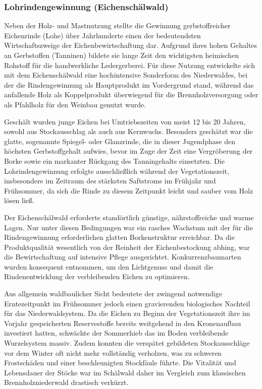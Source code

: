 \documentclass[twocolumn, bibliography=totoc, abstract=true]{scrartcl}
\begin{document}
\subsubsection{Lohrindengewinnung (Eichenschälwald)}

Neben der Holz- und Mastnutzung stellte die Gewinnung gerbstoffreicher Eichenrinde (Lohe) über Jahrhunderte einen der bedeutendsten Wirtschaftszweige der Eichenbewirtschaftung dar. Aufgrund ihres hohen Gehaltes an Gerbstoffen (Tanninen) bildete sie lange Zeit den wichtigsten heimischen Rohstoff für die handwerkliche Ledergerberei. Für diese Nutzung entwickelte sich mit dem Eichenschälwald eine hochintensive Sonderform des Niederwaldes, bei der die Rindengewinnung als Hauptprodukt im Vordergrund stand, während das anfallende Holz als Koppelprodukt überwiegend für die Brennholzversorgung oder als Pfahlholz für den Weinbau genutzt wurde.

Geschält wurden junge Eichen bei Umtriebszeiten von meist 12 bis 20 Jahren, sowohl aus Stockausschlag als auch aus Kernwuchs. Besonders geschätzt war die glatte, sogenannte Spiegel- oder Glanzrinde, die in dieser Jugendphase den höchsten Gerbstoffgehalt aufwies, bevor im Zuge der Zeit eine Vergröberung der Borke sowie ein markanter Rückgang des Tanningehalts einsetzten. Die Lohrindengewinnung erfolgte ausschließlich während der Vegetationszeit, insbesondere im Zeitraum des stärksten Saftstroms im Frühjahr und Frühsommer, da sich die Rinde zu diesem Zeitpunkt leicht und sauber vom Holz lösen ließ.

Der Eichenschälwald erforderte standörtlich günstige, nährstoffreiche und warme Lagen. Nur unter diesen Bedingungen war ein rasches Wachstum mit der für die Rindengewinnung erforderlichen glatten Borkenstruktur erreichbar. Da die Produktqualität wesentlich von der Reinheit der Eichenbestockung abhing, war die Bewirtschaftung auf intensive Pflege ausgerichtet. Konkurrenzbaumarten wurden konsequent entnommen, um den Lichtgenuss und damit die Rindenentwicklung der verbleibenden Eichen zu optimieren.

Aus allgemein waldbaulicher Sicht bedeutete der zwingend notwendige Erntezeitpunkt im Frühsommer jedoch einen gravierenden biologisches Nachteil für das Niederwaldsystem. Da die Eichen zu Beginn der Vegetationszeit ihre im Vorjahr gespeicherten Reservestoffe bereits weitgehend in den Kronenaufbau investiert hatten, schwächte der Sommerhieb das im Boden verbleibende Wurzelsystem massiv. Zudem konnten die verspätet gebildeten Stockausschläge vor dem Winter oft nicht mehr vollständig verholzen, was zu schweren Frostschäden und einer beschleunigten Stockfäule führte. Die Vitalität und Lebensdauer der Stöcke war im Schälwald daher im Vergleich zum klassischen Brennholzniederwald drastisch verkürzt.
\end{document}
